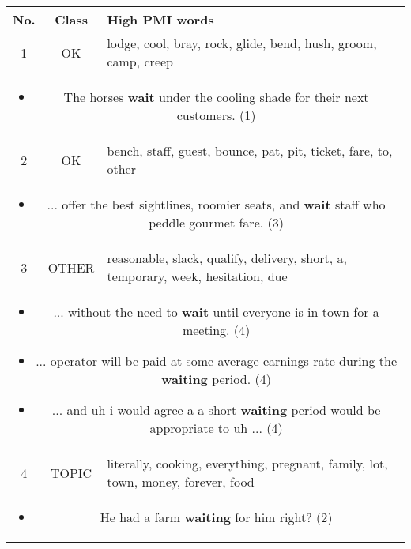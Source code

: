 \documentclass[11pt,a4paper]{article}
\begin{document}
\begin{table*}[ht!]
\centering
\begin{tabularx}{\linewidth}{| c | c | X  |}
	\hline

	\textbf{No.} & Class & \textbf{High PMI words} \\ \hline \hline 
    1 & OK & lodge, cool, bray, rock, glide, bend, hush, groom, camp, creep \\ \hline
    \multicolumn{3}{|p{0.92\linewidth}|}{
    \begin{itemize}[topsep=0pt,itemsep=0pt,partopsep=0pt, parsep=0pt]
        \item The horses {\bf wait} under the cooling shade for their next customers. (1)
    \end{itemize}
  } \\
  \hline\hline
  2 & OK & bench, staff, guest, bounce, pat, pit, ticket, fare, to, other \\ \hline
    \multicolumn{3}{|p{0.92\linewidth}|}{
    \begin{itemize}[topsep=0pt,itemsep=0pt,partopsep=0pt, parsep=0pt]
        \item ... offer the best sightlines, roomier seats, and {\bf wait} staff who peddle gourmet fare. (3)
    \end{itemize}
  }\\
  \hline\hline
    3 & OTHER & reasonable, slack, qualify, delivery, short, a, temporary, week, hesitation, due \\ \hline
    \multicolumn{3}{|p{0.92\linewidth}|}{
    \begin{itemize}[topsep=2pt,itemsep=0pt,partopsep=0pt, parsep=0pt]
        \item ... without the need to {\bf wait} until everyone is in town for a meeting. (4)
        \item ... operator will be paid at some average earnings rate during the {\bf waiting} period. (4)
      \item ... and uh i would agree a a short {\bf waiting} period would be appropriate to uh ... (4)
    \end{itemize}
  }\\
  \hline\hline
    4  & TOPIC & literally, cooking, everything, pregnant, family, lot, town, money, forever, food \\ \hline
    \multicolumn{3}{|p{0.92\linewidth}|}{
    \begin{itemize}[topsep=0pt,itemsep=0pt,partopsep=0pt, parsep=0pt]
        \item He had a farm {\bf waiting} for him right? (2)

\end{itemize}}
\end{tabularx}
\end{table*}
\end{document}
